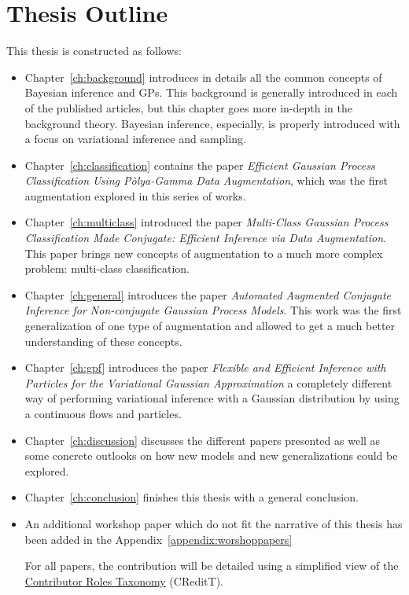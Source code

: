 \section{Thesis Outline}

This thesis is constructed as follows:
\begin{itemize}
    \item Chapter~\ref{ch:background} introduces in details all the common concepts of Bayesian inference and \ac{GPs}.
    This background is generally introduced in each of the published articles, but this chapter goes more in-depth in the background theory.
    Bayesian inference, especially, is properly introduced with a focus on variational inference and sampling.
    \item Chapter~\ref{ch:classification} contains the paper \textit{Efficient Gaussian Process Classification Using P\`olya-Gamma Data Augmentation}, which was the first augmentation explored in this series of works.
    \item Chapter~\ref{ch:multiclass} introduced the paper \textit{Multi-Class Gaussian Process Classification Made Conjugate: Efficient Inference via Data Augmentation}.
    This paper brings new concepts of augmentation to a much more complex problem: multi-class classification.
    \item Chapter~\ref{ch:general} introduces the paper \textit{Automated Augmented Conjugate Inference for Non-conjugate Gaussian Process Models}.
    This work was the first generalization of one type of augmentation and allowed to get a much better understanding of these concepts.
    \item Chapter~\ref{ch:gpf} introduces the paper \textit{Flexible and Efficient Inference with Particles for the Variational Gaussian Approximation } a completely different way of performing variational inference with a Gaussian distribution by using a continuous flows and particles.
    \item Chapter~\ref{ch:discussion} discusses the different papers presented as well as some concrete outlooks on how new models and new generalizations could be explored.
    \item Chapter~\ref{ch:conclusion} finishes this thesis with a general conclusion.
    \item An additional workshop paper which do not fit the narrative of this thesis has been added in the Appendix~\ref{appendix:worshoppapers}

    For all papers, the contribution will be detailed using a simplified view of the \href{https://mdpi-res.com/data/contributor-role-instruction.pdf}{Contributor Roles Taxonomy} (CReditT).

\end{itemize}

